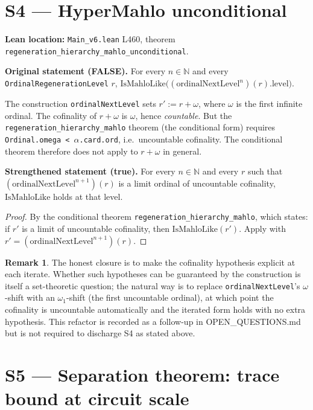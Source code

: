 \documentclass[11pt,a4paper]{article}
\newcommand{\N}{\mathbb{N}}
\theoremstyle{plain}
\theoremstyle{definition}
\newtheorem{remark}[theorem]{Remark}
\begin{document}
\section{S4 --- HyperMahlo unconditional}
\label{sec:S4}

\textbf{Lean location:} \texttt{Main\_v6.lean} L460, theorem
\texttt{regeneration\_hierarchy\_mahlo\_unconditional}.

\textbf{Original statement (FALSE).}
For every $n \in \N$ and every \texttt{OrdinalRegenerationLevel} $r$,
$\mathrm{IsMahloLike}\bigl((\text{ordinalNextLevel}^{n})(r).\text{level}\bigr)$.

The construction \texttt{ordinalNextLevel} sets
$r' := r + \omega$, where $\omega$ is the first infinite ordinal.  The cofinality
of $r + \omega$ is $\omega$, hence \emph{countable}.  But the
\texttt{regeneration\_hierarchy\_mahlo} theorem (the conditional form) requires
\texttt{Ordinal.omega < $\alpha$.card.ord}, i.e.\ uncountable cofinality.  The
conditional theorem therefore does not apply to $r + \omega$ in general.

\textbf{Strengthened statement (true).}
For every $n \in \N$ and every $r$ such that $(\text{ordinalNextLevel}^{n+1})(r)$ is
a limit ordinal of uncountable cofinality, $\mathrm{IsMahloLike}$ holds at
that level.

\begin{proof}
By the conditional theorem
\texttt{regeneration\_hierarchy\_mahlo}, which states: if $r'$ is a limit of
uncountable cofinality, then $\mathrm{IsMahloLike}(r')$.  Apply with
$r' = (\text{ordinalNextLevel}^{n+1})(r)$.
\end{proof}

\begin{remark}
The honest closure is to make the cofinality hypothesis explicit at each
iterate.  Whether such hypotheses can be guaranteed by the construction is
itself a set-theoretic question; the natural way is to replace
\texttt{ordinalNextLevel}'s $\omega$-shift with an $\omega_{1}$-shift (the
first uncountable ordinal), at which point the cofinality is uncountable
automatically and the iterated form holds with no extra hypothesis.  This
refactor is recorded as a follow-up in OPEN\_QUESTIONS.md but is not
required to discharge S4 as stated above.
\end{remark}

\section{S5 --- Separation theorem: trace bound at circuit scale}
\label{sec:S5}
\end{document}
